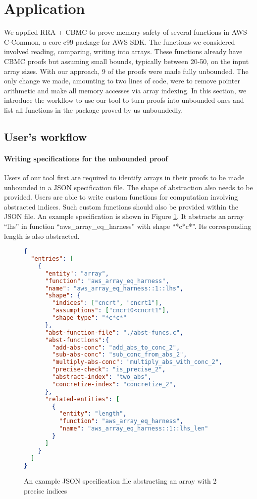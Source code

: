 \section{Application}

We applied RRA + CBMC to prove memory safety of several functions in
AWS-C-Common, a core c99 package for AWS SDK.  The functions we
considered involved reading, comparing, writing into arrays. These
functions already have CBMC proofs but assuming small bounds,
typically between 20-50, on the input array sizes.  With our approach,
9 of the proofs were made fully unbounded. The only change we made,
amounting to two lines of code, were to remove pointer arithmetic and
make all memory accesses via array indexing. In this section, we
introduce the workflow to use our tool to turn proofs into unbounded
ones and list all functions in the package proved by us unboundedly.

\subsection{User's workflow}

\paragraph{Writing specifications for the unbounded proof} 

Users of our tool first are required to identify arrays in their
proofs to be made unbounded in a JSON specification file. The shape of
abstraction also needs to be provided. Users are able to write custom
functions for computation involving abstracted indices. Such custom
functions should also be provided within the JSON file. An example
specification is shown in Figure \ref{fig:examplejson}. It abstracts
an array ``lhs'' in function ``aws\_array\_eq\_harness'' with shape
``*c*c*''. Its corresponding length is also abstracted.

\begin{figure}[H]
	\begin{lstlisting}[language=json]
{
  "entries": [
    {
      "entity": "array",
      "function": "aws_array_eq_harness",
      "name": "aws_array_eq_harness::1::lhs",
      "shape": {
        "indices": ["cncrt", "cncrt1"],
        "assumptions": ["cncrt0<cncrt1"],
        "shape-type": "*c*c*"
      },
      "abst-function-file": "./abst-funcs.c",
      "abst-functions":{
        "add-abs-conc": "add_abs_to_conc_2",
        "sub-abs-conc": "sub_conc_from_abs_2",
        "multiply-abs-conc": "multiply_abs_with_conc_2",
        "precise-check": "is_precise_2",
        "abstract-index": "two_abs",
        "concretize-index": "concretize_2",
      },
      "related-entities": [
        {
          "entity": "length",
          "function": "aws_array_eq_harness",
          "name": "aws_array_eq_harness::1::lhs_len"
        }
      ]
    }
  ]
}
  \end{lstlisting}
	\caption{An example JSON specification file abstracting an array with 2 precise indices}
	\label{fig:examplejson}
\end{figure}

